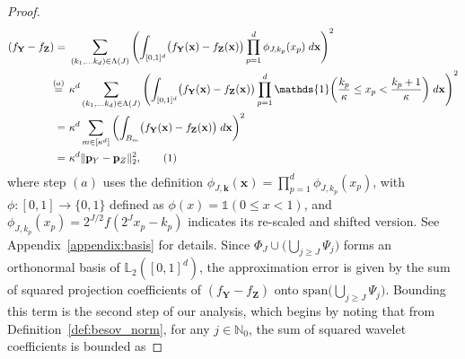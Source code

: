 \documentclass[twoside,11pt]{article}
\newcommand\numberthis{\addtocounter{equation}{1}\tag{\theequation}}
\newcommand{\rvTwo}{Y}
\newcommand{\rvThree}{Z}
\newcommand{\vectorize}[1]{\mathbf{#1}}
\newcommand{\dimDensity}{d} %
\newcommand{\vectorIndex}{m}
\newcommand{\dimensionIndex}{p}
\newcommand{\probVec}{\mathbf{p}} %
\newcommand{\binNum}{\kappa}           %
\newcommand{\wavFatherFunc}{\phi}
\newcommand{\resLev}{j}
\newcommand{\primResLev}{J}
\newcommand{\wavFatherUnivIndex}{k}
\newcommand{\wavFatherIndex}{\boldsymbol{\wavFatherUnivIndex}}
\newcommand{\domainTs}{
	[0,1]^{{\dimDensity}}
}
\newcommand{\LtwoSpace}{\mathbb{L}_{2}(\domainTs)}
\begin{document}
\begin{appendix}
\begin{proof}
\begin{align*}
			(f_{\vectorize{Y}} - f_{\vectorize{Z}})
			=~&
			\sum_{(k_1, \ldots k_\dimDensity) \in \Lambda(\primResLev)}
			\left(
			\int_{[0,1]^\dimDensity}
			\bigl(
			f_{\vectorize{Y}}(\vectorize{x}) - f_{\vectorize{Z}}(\vectorize{x})
			\bigr)
			\prod_{\dimensionIndex = 1}^{\dimDensity}
			\wavFatherFunc_{\primResLev, \wavFatherUnivIndex_\dimensionIndex}(x_\dimensionIndex)
			\;
			d\vectorize{x}
			\right)^2
			\\\stackrel{(a)}{=} \hskip 1.57mm &
			\binNum^\dimDensity
			\sum_{(k_1, \ldots k_\dimDensity) \in \Lambda(\primResLev)}
			\left(
			\int_{[0,1]^\dimDensity}
			\bigl(
			f_{\vectorize{Y}}(\vectorize{x}) - f_{\vectorize{Z}}(\vectorize{x})
			\bigr)
			\prod_{p = 1}^{\dimDensity}
			\mathds{1}
			\biggl(
			\frac{k_p}{\binNum}
			\leq
			x_p
			<
			\frac{k_p + 1}{\binNum}
			\biggr)
			\;
			d\vectorize{x}
			\right)^2
			\\=~&
			\binNum^\dimDensity
			\sum_{\vectorIndex \in [\binNum^\dimDensity]}
			\left(
			\int_{B_\vectorIndex}
			\bigl(
			f_{\vectorize{Y}}(\vectorize{x}) - f_{\vectorize{Z}}(\vectorize{x})
			\bigr)
			\;
			d\vectorize{x}
			\right)^2
			\\=~&
			\binNum^\dimDensity
			\|\probVec_{\rvTwo} - \probVec_{\rvThree}\|_2^2,
			\numberthis \label{eq:equiv_wavCoef_discProb_full}
		\end{align*}
		where step $(a)$ uses the definition $ \wavFatherFunc_{\primResLev, \wavFatherIndex}(\vectorize{x}) = \prod_{\dimensionIndex = 1}^{\dimDensity} \wavFatherFunc_{\primResLev, \wavFatherUnivIndex_\dimensionIndex}(x_\dimensionIndex)$, with $\wavFatherFunc: [0,1] \to \{0,1\}$ defined as $\wavFatherFunc(x) = \mathds{1}(0 \leq x < 1)$,
		and $\wavFatherFunc_{\primResLev, \wavFatherUnivIndex_\dimensionIndex}(x_\dimensionIndex) = 2^{\primResLev/2}f(2^\primResLev x_p - k_p)$ indicates its re-scaled and shifted version. See Appendix~\ref{appendix:basis} for details.
		Since ${\Phi}_{\primResLev} \cup \bigl( \bigcup_{\resLev \geq \primResLev} {\Psi}_\resLev \bigr)$ forms an orthonormal basis of $\LtwoSpace$, the approximation error is given by the sum of squared projection coefficients of $(f_{\vectorize{Y}} - f_{\vectorize{Z}})$ onto $\text{span}\bigl(\bigcup_{\resLev \geq \primResLev} \Psi_\resLev \bigr)$.
		Bounding this term is the second step of our analysis, which begins by noting that from Definition~\ref{def:besov_norm}, for any $j \in \mathbb{N}_0$, the sum of squared wavelet coefficients is bounded as

\end{proof}
\end{appendix}
\end{document}
